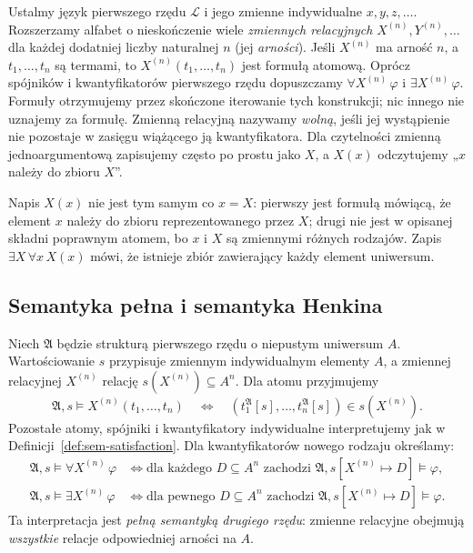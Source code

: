 \begin{definicja}\label{def:second-order-syntax}
Ustalmy język pierwszego rzędu $\mathcal L$ i jego zmienne
indywidualne $x,y,z,\ldots$. Rozszerzamy alfabet o nieskończenie
wiele \emph{zmiennych relacyjnych} $X^{(n)},Y^{(n)},\ldots$ dla
każdej dodatniej liczby naturalnej $n$ (jej \emph{arności}).
Jeśli $X^{(n)}$ ma arność $n$, a $t_1,\ldots,t_n$ są termami, to
$X^{(n)}(t_1,\ldots,t_n)$ jest formułą atomową. Oprócz spójników
i kwantyfikatorów pierwszego rzędu dopuszczamy
$\forall X^{(n)}\,\varphi$ i $\exists X^{(n)}\,\varphi$.
Formuły otrzymujemy przez skończone iterowanie tych konstrukcji;
nic innego nie uznajemy za formułę. Zmienną relacyjną nazywamy
\emph{wolną}, jeśli jej wystąpienie nie pozostaje w zasięgu
wiążącego ją kwantyfikatora.
Dla czytelności zmienną jednoargumentową zapisujemy często po
prostu jako $X$, a $X(x)$ odczytujemy „$x$ należy do zbioru $X$”.
\end{definicja}

\begin{przyklad}
Napis $X(x)$ nie jest tym samym co $x=X$: pierwszy jest formułą
mówiącą, że element $x$ należy do zbioru reprezentowanego przez $X$;
drugi nie jest w opisanej składni poprawnym atomem, bo $x$ i $X$
są zmiennymi różnych rodzajów. Zapis $\exists X\,\forall x\,X(x)$
mówi, że istnieje zbiór zawierający każdy element uniwersum.
\end{przyklad}

\subsection{Semantyka pełna i semantyka Henkina}
\begin{definicja}
\label{def:second-order-full-semantics}
Niech $\mathfrak A$ będzie strukturą pierwszego rzędu o
niepustym uniwersum $A$. Wartościowanie $s$ przypisuje zmiennym
indywidualnym elementy $A$, a zmiennej relacyjnej $X^{(n)}$
relację $s(X^{(n)})\subseteq A^n$. Dla atomu przyjmujemy
\[
 \mathfrak A,s\models X^{(n)}(t_1,\ldots,t_n)
 \quad\Longleftrightarrow\quad
 (t_1^{\mathfrak A}[s],\ldots,t_n^{\mathfrak A}[s])
 \in s(X^{(n)}).
\]
Pozostałe atomy, spójniki i kwantyfikatory indywidualne
interpretujemy jak w Definicji~\ref{def:sem-satisfaction}.
Dla kwantyfikatorów nowego rodzaju określamy:
\[
\begin{aligned}
\mathfrak A,s\models\forall X^{(n)}\,\varphi
 &\iff \text{dla każdego }D\subseteq A^n\text{ zachodzi }
 \mathfrak A,s[X^{(n)}\mapsto D]\models\varphi,\\
\mathfrak A,s\models\exists X^{(n)}\,\varphi
 &\iff \text{dla pewnego }D\subseteq A^n\text{ zachodzi }
 \mathfrak A,s[X^{(n)}\mapsto D]\models\varphi.
\end{aligned}
\]
Ta interpretacja jest \emph{pełną semantyką drugiego rzędu}:
zmienne relacyjne obejmują \emph{wszystkie} relacje odpowiedniej
arności na $A$.
\end{definicja}


